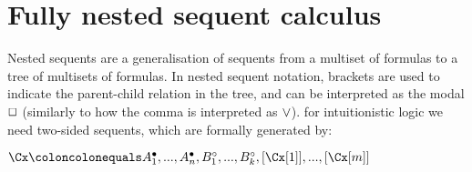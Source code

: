 \documentclass[twoside]{aiml20}
\begin{document}
%
%
%



\section{Fully nested sequent calculus}\label{sec:nested}

%
Nested sequents are a generalisation of sequents from a multiset
of formulas to a tree of multisets of formulas.
In nested sequent notation, brackets are used to indicate the parent-child relation in the tree, and can be interpreted as the modal $\mathord{\Box}$ (similarly to how the comma is interpreted as $\mathbin{\vee}$). for intuitionistic logic we need two-sided sequents, which are formally generated by:
\begin{center}
	$\Cx \coloncolonequals \lf{A_{1}}, ..., \lf{A_{n}}, \rt{B_{1}},..., \rt{B_{k}}, \BR{\Cx[1]},..., \BR{\Cx[m]}$
\end{center}
\end{document}
